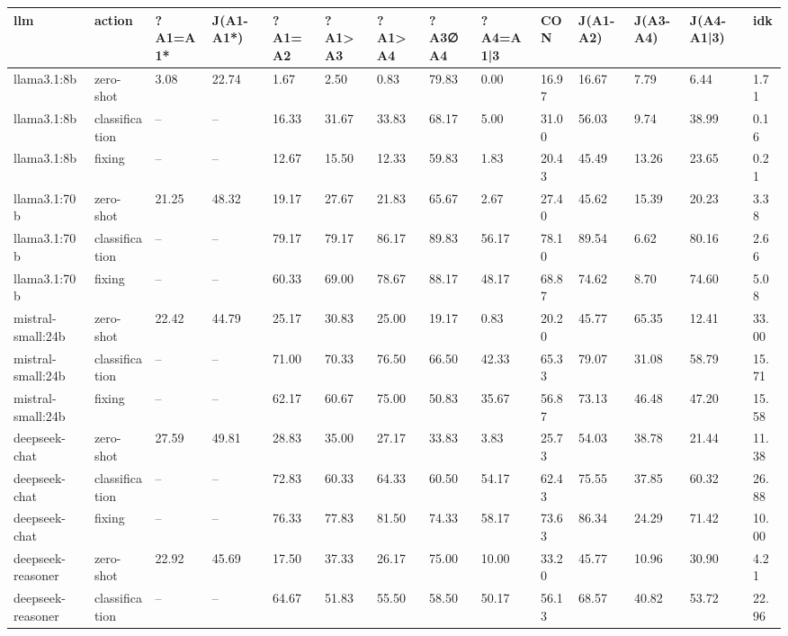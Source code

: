 \begin{table}[!t]
\centering\scriptsize
\begin{tabular}{llllllllllllll}
\toprule
llm & action & ?A1=A1* & J(A1-A1*) & ?A1=A2 & ?A1>A3 & ?A1>A4 & ?A3∅A4 & ?A4=A1|3 & CON & J(A1-A2) & J(A3-A4) & J(A4-A1|3) & idk \\
\midrule
llama3.1:8b & zero-shot & 3.08 & 22.74 & 1.67 & 2.50 & 0.83 & 79.83 & 0.00 & 16.97 & 16.67 & 7.79 & 6.44 & 1.71 \\
llama3.1:8b & classification & -- & -- & 16.33 & 31.67 & 33.83 & 68.17 & 5.00 & 31.00 & 56.03 & 9.74 & 38.99 & 0.16 \\
llama3.1:8b & fixing & -- & -- & 12.67 & 15.50 & 12.33 & 59.83 & 1.83 & 20.43 & 45.49 & 13.26 & 23.65 & 0.21 \\
llama3.1:70b & zero-shot & 21.25 & 48.32 & 19.17 & 27.67 & 21.83 & 65.67 & 2.67 & 27.40 & 45.62 & 15.39 & 20.23 & 3.38 \\
llama3.1:70b & classification & -- & -- & 79.17 & 79.17 & 86.17 & 89.83 & 56.17 & 78.10 & 89.54 & 6.62 & 80.16 & 2.66 \\
llama3.1:70b & fixing & -- & -- & 60.33 & 69.00 & 78.67 & 88.17 & 48.17 & 68.87 & 74.62 & 8.70 & 74.60 & 5.08 \\
mistral-small:24b & zero-shot & 22.42 & 44.79 & 25.17 & 30.83 & 25.00 & 19.17 & 0.83 & 20.20 & 45.77 & 65.35 & 12.41 & 33.00 \\
mistral-small:24b & classification & -- & -- & 71.00 & 70.33 & 76.50 & 66.50 & 42.33 & 65.33 & 79.07 & 31.08 & 58.79 & 15.71 \\
mistral-small:24b & fixing & -- & -- & 62.17 & 60.67 & 75.00 & 50.83 & 35.67 & 56.87 & 73.13 & 46.48 & 47.20 & 15.58 \\
deepseek-chat & zero-shot & 27.59 & 49.81 & 28.83 & 35.00 & 27.17 & 33.83 & 3.83 & 25.73 & 54.03 & 38.78 & 21.44 & 11.38 \\
deepseek-chat & classification & -- & -- & 72.83 & 60.33 & 64.33 & 60.50 & 54.17 & 62.43 & 75.55 & 37.85 & 60.32 & 26.88 \\
deepseek-chat & fixing & -- & -- & 76.33 & 77.83 & 81.50 & 74.33 & 58.17 & 73.63 & 86.34 & 24.29 & 71.42 & 10.00 \\
deepseek-reasoner & zero-shot & 22.92 & 45.69 & 17.50 & 37.33 & 26.17 & 75.00 & 10.00 & 33.20 & 45.77 & 10.96 & 30.90 & 4.21 \\
deepseek-reasoner & classification & -- & -- & 64.67 & 51.83 & 55.50 & 58.50 & 50.17 & 56.13 & 68.57 & 40.82 & 53.72 & 22.96 \\

\end{tabular}
\end{table}
